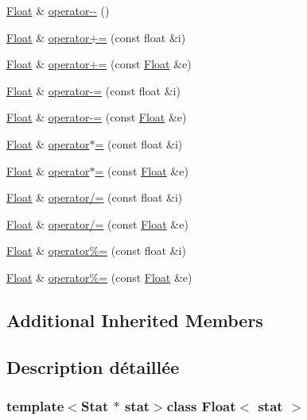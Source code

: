 \begin{DoxyCompactItemize}
\hyperlink{class_float}{Float} \& \hyperlink{class_float_a898785de683a3f713e204bd215e955aa}{operator-\/-\/} ()
\item 
\hyperlink{class_float}{Float} \& \hyperlink{class_float_a186e649c71eade88e00550424cfa5d97}{operator+=} (const float \&i)
\item 
\hyperlink{class_float}{Float} \& \hyperlink{class_float_aa21413928861c3bcb4d7ab8716ed560b}{operator+=} (const \hyperlink{class_float}{Float} \&e)
\item 
\hyperlink{class_float}{Float} \& \hyperlink{class_float_a00dae468efad0ab93dadc37c5190e7ae}{operator-\/=} (const float \&i)
\item 
\hyperlink{class_float}{Float} \& \hyperlink{class_float_a644369b297eaefdae0ca276693ce7261}{operator-\/=} (const \hyperlink{class_float}{Float} \&e)
\item 
\hyperlink{class_float}{Float} \& \hyperlink{class_float_a249cb3e3648c43141b93aa24dc3bf1e6}{operator$\ast$=} (const float \&i)
\item 
\hyperlink{class_float}{Float} \& \hyperlink{class_float_a7c757c986315f93d481c56f7c9fb99f6}{operator$\ast$=} (const \hyperlink{class_float}{Float} \&e)
\item 
\hyperlink{class_float}{Float} \& \hyperlink{class_float_a0ed5beba2862fb7b045ba3c37fc79b84}{operator/=} (const float \&i)
\item 
\hyperlink{class_float}{Float} \& \hyperlink{class_float_a261f58fac8aef8d63b126dd3cf6e8033}{operator/=} (const \hyperlink{class_float}{Float} \&e)
\item 
\hyperlink{class_float}{Float} \& \hyperlink{class_float_aa1e0fdc5414ac89b911defd3037bfc51}{operator\%=} (const float \&i)
\item 
\hyperlink{class_float}{Float} \& \hyperlink{class_float_a5bf274605ae0174be0e34b79a4761e2d}{operator\%=} (const \hyperlink{class_float}{Float} \&e)
\end{DoxyCompactItemize}
\subsection*{Additional Inherited Members}


\subsection{Description détaillée}
\subsubsection*{template$<$Stat $\ast$ stat$>$class Float$<$ stat $>$}

